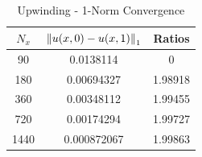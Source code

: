 \documentclass[12pt]{article}
\begin{document}
\begin{enumerate}[(a)]
\begin{minipage}{0.5\textwidth}
\begin{table}[H]
\caption{Upwinding - 1-Norm Convergence}
\centering\begin{tabular}{||c|cc||}
\hline \hline
    $N_x$ &   $\norm{u(x,0)-u(x,1)}_1$ &   Ratios \\
\hline
    90 &    0.0138114   &  0       \\
   180 &    0.00694327  &  1.98918 \\
   360 &    0.00348112  &  1.99455 \\
   720 &    0.00174294  &  1.99727 \\
  1440 &    0.000872067 &  1.99863 \\

\end{tabular}
\end{table}
\end{minipage}
\end{enumerate}
\end{document}
